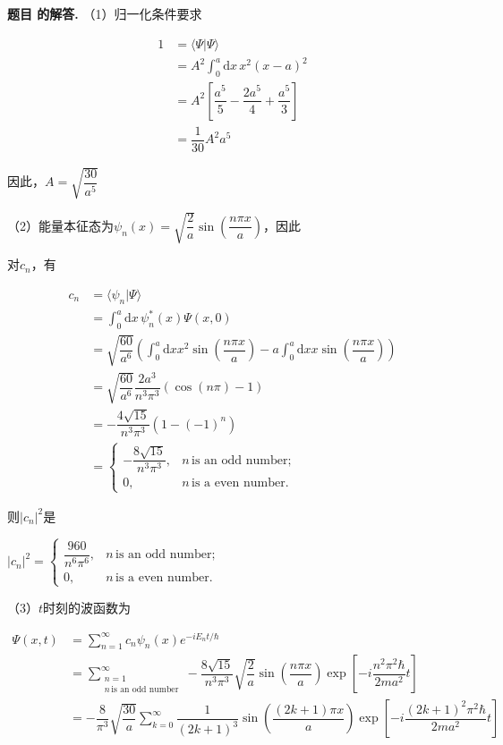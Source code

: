 \documentclass[12pt, a4paper, oneside]{ctexart}
\newcounter{problemname}
\newenvironment{solution}
  {\par\noindent\textbf{题目 \theproblemname 的解答. }}
  {\par}
\begin{document}
\begin{solution}
    （1）归一化条件要求

    \begin{align*}
      1 &= \langle \varPsi | \varPsi \rangle \\
      &= A^2 \displaystyle\int_0^a \mathrm{d}x\,x^2(x-a)^2 \\
      &= A^2 \left[\dfrac{a^5}{5} - \dfrac{2a^5}{4} + \dfrac{a^5}{3}\right] \\
      &= \dfrac{1}{30} A^2 a^5
    \end{align*}

    因此，$A = \sqrt{\dfrac{30}{a^5}}$

    （2）能量本征态为$\psi_n(x) = \sqrt{\dfrac{2}{a}}\sin\left(\dfrac{n\pi x}{a}\right)$，因此

        对$c_n$，有

        \begin{align*}
          c_n &= \langle \psi_n | \varPsi \rangle \\
          &= \displaystyle\int_0^a \mathrm{d}x\,\psi_n^*(x)\varPsi(x,0) \\
          &= \sqrt{\dfrac{60}{a^6}}\left( \displaystyle\int_0^a \mathrm{d}x x^2 \sin\left(\dfrac{n \pi x}{a}\right) - a \displaystyle\int_0^a \mathrm{d}x x \sin\left(\dfrac{n \pi x}{a}\right)\right) \\
          &= \sqrt{\dfrac{60}{a^6}} \dfrac{2a^3}{n^3 \pi^3} \left(\cos(n \pi) - 1 \right)\\
          &= - \dfrac{4 \sqrt{15}}{n^3 \pi^3} \left(1 - (-1)^n \right)\\
          &= \begin{cases}
            - \dfrac{8 \sqrt{15}}{n^3 \pi^3}, & n \,\text{is an odd number;} \\
            0, & n \,\text{is a even number.}
          \end{cases}
        \end{align*}

        则$|c_n|^2$是

        \centerline{$|c_n|^2 = \begin{cases}
          \dfrac{960}{n^6 \pi^6}, & n \,\text{is an odd number;} \\
          0, & n \,\text{is a even number.}
        \end{cases}$}

    （3）$t$时刻的波函数为

    \begin{align*}
      \varPsi(x,t) &= \displaystyle\sum_{n=1}^{\infty} c_n \psi_n(x) e^{-iE_nt/\hbar} \\
      &= \displaystyle\sum_{\substack{n=1 \\ n\,\text{is an odd number}}}^{\infty} - \dfrac{8 \sqrt{15}}{n^3 \pi^3} \sqrt{\dfrac{2}{a}}\sin\left(\dfrac{n\pi x}{a}\right) \exp\left[{-i\dfrac{n^2 \pi^2 \hbar}{2ma^2}t}\right] \\
      &= - \dfrac{8}{\pi^3} \sqrt{\dfrac{30}{a}} \displaystyle \sum_{k=0}^{\infty} \dfrac{1}{(2k+1)^3} \sin\left(\dfrac{(2k+1)\pi x}{a}\right) \exp\left[{-i\dfrac{(2k+1)^2 \pi^2 \hbar}{2ma^2}t}\right]
    \end{align*}


\end{solution}
\end{document}
